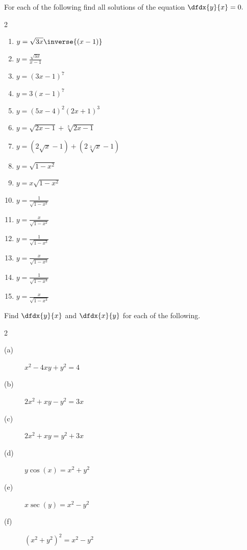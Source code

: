 \begin{ProblemSection}
\begin{embeddedproblem}{}
    For each of the following find all solutions of the equation
    $\dfdx{y}{x} =0.$
    \begin{multicols}{2}
      \begin{enumerate}[label={\bf{}(\alph*)}]
      \item $ y=\sqrt{3x}\inverse{(x-1)}$
      \item $ y=\frac{\sqrt{3x}}{x-1}$
      \item $ y=(3x-1)^7$
      \item $ y=3(x-1)^7$
      \item $ y=(5x-4)^2(2x+1)^3$
      \item $ y=\sqrt{2x-1}+\sqrt[3]{2x-1}$
      \item $ y=\left(2\sqrt{x}-1\right)+\left(2\sqrt[3]{x}-1\right)$
      \item $ y=\sqrt{1-x^2}$
      \item $ y=x\sqrt{1-x^2}$
      \item $ y=\frac{1}{\sqrt{1-x^2}}$
      \item $ y=\frac{x}{\sqrt{1-x^2}}$
      \item $ y=\frac{1}{\sqrt{1-x^3}}$
      \item $ y=\frac{x}{\sqrt{1-x^3}}$
      \item $ y=\frac{1}{\sqrt{1-x^4}}$
      \item $ y=\frac{x}{\sqrt{1-x^4}}$
      \end{enumerate}
    \end{multicols}
  \end{embeddedproblem}

  \begin{embeddedproblem}{}
    Find $\dfdx{y}{x}$ and $\dfdx{x}{y}$ for each of the following.
    \begin{multicols}{2}
      \begin{description}
      \item[(a)] $x^2-4xy+y^2=4$
      \item[(b)] $2x^2+xy-y^2=3x$
      \item[(c)] $2x^2+xy=y^2+3x$
      \item[(d)] $y\cos(x) = x^2+y^2$
      \item[(e)] $x\sec(y) = x^2-y^2$
      \item[(f)] $(x^2+y^2)^2 = x^2-y^2$
      \end{description}
    \end{multicols}
  \end{embeddedproblem}


\end{ProblemSection}
